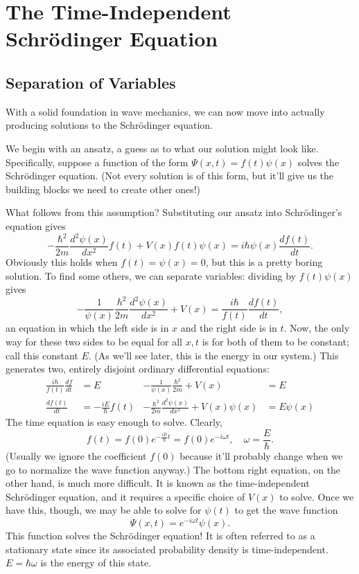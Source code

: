 \documentclass[../p052main.tex]{subfiles}
\begin{document}
\chapter{The Time-Independent Schrödinger Equation}
\section{Separation of Variables}
With a solid foundation in wave mechanics, we can now move into actually producing solutions to the Schrödinger equation.

We begin with an ansatz, a guess as to what our solution might look like.
Specifically, suppose a function of the form $\Psi(x,t) = f(t) \psi(x)$ solves the Schrödinger equation.
(Not every solution is of this form, but it'll give us the building blocks we need to create other ones!)

What follows from this assumption?
Substituting our ansatz into Schrödinger's equation gives
\[ -\frac{\hbar^2}{2m} \frac{d^2 \psi(x)}{dx^2} f(t) + V(x)f(t)\psi(x) = i\hbar \psi(x) \frac{df(t)}{dt}. \]
Obviously this holds when $f(t) = \psi(x) = 0$, but this is a pretty boring solution.
To find some others, we can separate variables: dividing by $f(t)\psi(x)$ gives
\[ -\frac{1}{\psi(x)}\frac{\hbar^2}{2m} \frac{d^2 \psi(x)}{dx^2} + V(x) = \frac{i\hbar}{f(t)} \frac{df(t)}{dt}, \]
an equation in which the left side is in $x$ and the right side is in $t$.
Now, the only way for these two sides to be equal for all $x,t$ is for both of them to be constant; call this constant $E$.
(As we'll see later, this is the energy in our system.)
This generates two, entirely disjoint ordinary differential equations:
\begin{align*}
    \frac{i\hbar}{f(t)}\frac{df}{dt} &= E & -\frac{1}{\psi(x)}\frac{\hbar^2}{2m} + V(x) &= E \\
    \frac{df(t)}{dt} &= -\frac{iE}{\hbar} f(t) & -\frac{\hbar^2}{2m} \frac{d^2 \psi(x)}{dx^2} + V(x) \psi(x) &= E \psi (x)
\end{align*}
The time equation is easy enough to solve.
Clearly,
\[ f(t) = f(0) e^{-\frac{iE}{\hbar}t} = f(0) e^{-i \omega t}, \quad \omega = \frac{E}{\hbar}. \]
(Usually we ignore the coefficient $f(0)$ because it'll probably change when we go to normalize the wave function anyway.)
The bottom right equation, on the other hand, is much more difficult.
It is known as the time-independent Schrödinger equation, and it requires a specific choice of $V(x)$ to solve.
Once we have this, though, we may be able to solve for $\psi(t)$ to get the wave function
\[ \Psi(x,t) = e^{-i \omega t} \psi(x). \]
This function solves the Schrödinger equation!
It is often referred to as a stationary state since its associated probability density is time-independent.
$E = \hbar \omega$ is the energy of this state.
\end{document}
